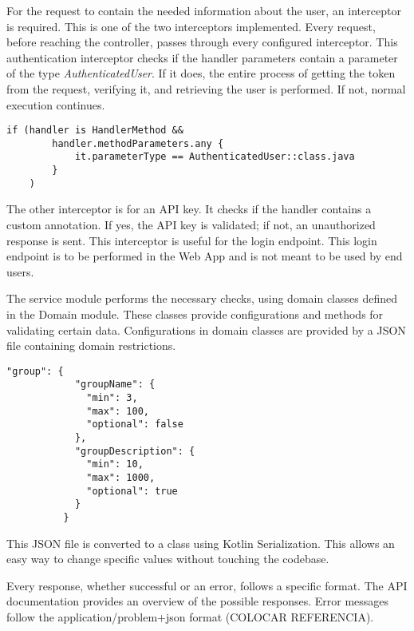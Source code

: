 For the request to contain the needed information about the user, an interceptor is required. This is one of the two interceptors implemented. Every request, before reaching the controller, passes through every configured interceptor. This authentication interceptor checks if the handler parameters contain a parameter of the type \textit{AuthenticatedUser}. If it does, the entire process of getting the token from the request, verifying it, and retrieving the user is performed. If not, normal execution continues.
\begin{center}
    \begin{lstlisting}[caption={Type AuthenticatedUser verification example}]
    if (handler is HandlerMethod &&
        handler.methodParameters.any {
            it.parameterType == AuthenticatedUser::class.java
        }
    )
    \end{lstlisting}
\end{center}

The other interceptor is for an API key. It checks if the handler contains a custom annotation. If yes, the API key is validated; if not, an unauthorized response is sent. This interceptor is useful for the login endpoint. This login endpoint is to be performed in the Web App and is not meant to be used by end users.

The service module performs the necessary checks, using domain classes defined in the Domain module. These classes provide configurations and methods for validating certain data. Configurations in domain classes are provided by a JSON file containing domain restrictions.

\begin{center}
    \begin{lstlisting}[caption={Example of the group entry}]
        "group": {
            "groupName": {
              "min": 3,
              "max": 100,
              "optional": false
            },
            "groupDescription": {
              "min": 10,
              "max": 1000,
              "optional": true
            }
          }
    \end{lstlisting}
\end{center}

This JSON file is converted to a class using Kotlin Serialization. This allows an easy way to change specific values without touching the codebase.

\vspace{3mm}

Every response, whether successful or an error, follows a specific format. The API documentation provides an overview of the possible responses. Error messages follow the application/problem+json format (COLOCAR REFERENCIA).

